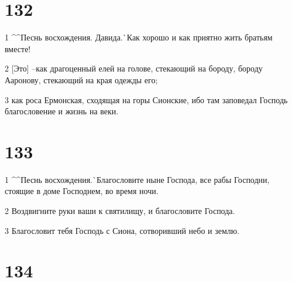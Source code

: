\chapter{132}

\par 1 ^^Песнь восхождения. Давида.^^ Как хорошо и как приятно жить братьям вместе!
\par 2 [Это] --как драгоценный елей на голове, стекающий на бороду, бороду Ааронову, стекающий на края одежды его;
\par 3 как роса Ермонская, сходящая на горы Сионские, ибо там заповедал Господь благословение и жизнь на веки.

\chapter{133}

\par 1 ^^Песнь восхождения.^^ Благословите ныне Господа, все рабы Господни, стоящие в доме Господнем, во время ночи.
\par 2 Воздвигните руки ваши к святилищу, и благословите Господа.
\par 3 Благословит тебя Господь с Сиона, сотворивший небо и землю.

\chapter{134}

